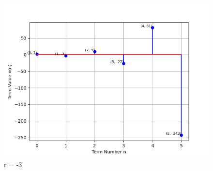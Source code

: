 \documentclass[journal,12pt,twocolumn]{IEEEtran}
\theoremstyle{remark}
\begin{document}
\begin{figure}
   \centering
     \includegraphics[width=1\columnwidth, height=1\columnwidth]{ncert-maths/11/9/5/9/figs/graph1.png}
     \caption{r = -3}
\end{figure}
\end{document}
